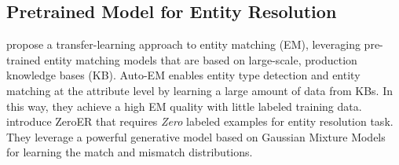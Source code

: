

\subsection{Pretrained Model for Entity Resolution}

\cite{zhao_auto-em_2019} propose a transfer-learning approach to entity matching (EM), leveraging pre-trained entity matching models that are based on large-scale, production knowledge bases (KB). Auto-EM enables entity type detection and entity matching at the attribute level by learning a large amount of data from KBs. In this way, they achieve a high EM quality with little labeled training data. \cite{wu_zeroer_2020} introduce ZeroER that requires \textit{Zero} labeled examples for entity resolution task. They leverage a powerful generative model based on Gaussian Mixture Models for learning the match and mismatch distributions. 

